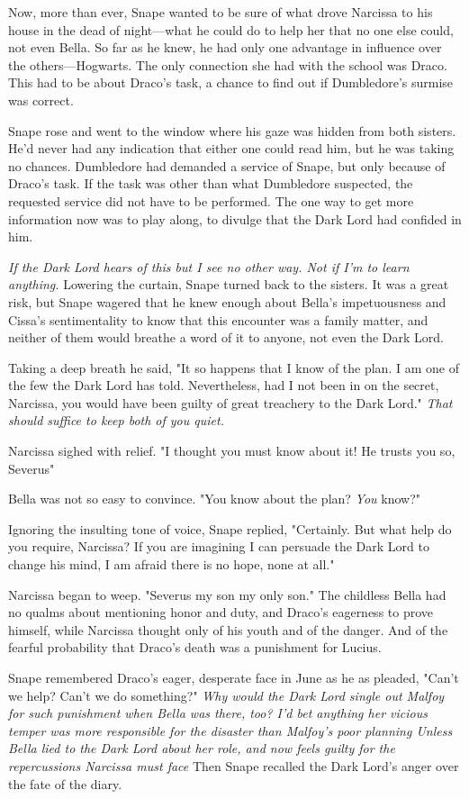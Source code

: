 Now, more than ever, Snape wanted to be sure of what drove Narcissa to his house in the dead of night—what he could do to help her that no one else could, not even Bella. So far as he knew, he had only one advantage in influence over the others—Hogwarts. The only connection she had with the school was Draco. This had to be about Draco's task, a chance to find out if Dumbledore's surmise was correct.

Snape rose and went to the window where his gaze was hidden from both sisters. He'd never had any indication that either one could read him, but he was taking no chances. Dumbledore had demanded a service of Snape, but only because of Draco's task. If the task was other than what Dumbledore suspected, the requested service did not have to be performed. The one way to get more information now was to play along, to divulge that the Dark Lord had confided in him.

\emph{If the Dark Lord hears of this{\el} but I see no other way. Not if I'm to learn anything.} Lowering the curtain, Snape turned back to the sisters. It was a great risk, but Snape wagered that he knew enough about Bella's impetuousness and Cissa's sentimentality to know that this encounter was a family matter, and neither of them would breathe a word of it to anyone, not even the Dark Lord.

Taking a deep breath he said, "It so happens that I know of the plan. I am one of the few the Dark Lord has told. Nevertheless, had I not been in on the secret, Narcissa, you would have been guilty of great treachery to the Dark Lord." \emph{That should suffice to keep both of you quiet.}

Narcissa sighed with relief. "I thought you must know about it! He trusts you so, Severus{\el}"

Bella was not so easy to convince. "You know about the plan? \emph{You} know?"

Ignoring the insulting tone of voice, Snape replied, "Certainly. But what help do you require, Narcissa? If you are imagining I can persuade the Dark Lord to change his mind, I am afraid there is no hope, none at all."

Narcissa began to weep. "Severus{\el} my son{\el} my only son." The childless Bella had no qualms about mentioning honor and duty, and Draco's eagerness to prove himself, while Narcissa thought only of his youth and of the danger. And of the fearful probability that Draco's death was a punishment for Lucius.

Snape remembered Draco's eager, desperate face in June as he as pleaded, "Can't we help? Can't we do something?" \emph{Why would the Dark Lord single out Malfoy for such punishment when Bella was there, too? I'd bet anything her vicious temper was more responsible for the disaster than Malfoy's poor planning{\el} Unless Bella lied to the Dark Lord about her role, and now feels guilty for the repercussions Narcissa must face{\el}} Then Snape recalled the Dark Lord's anger over the fate of the diary.

